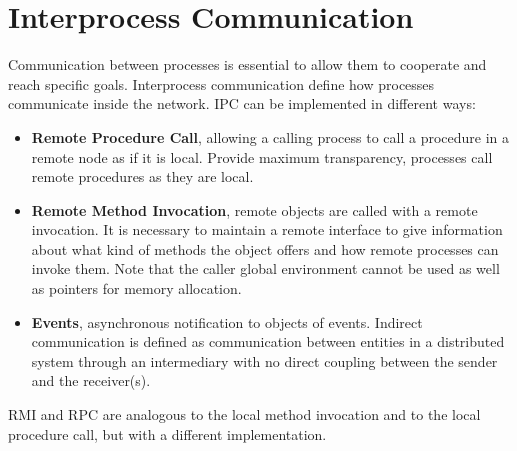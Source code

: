 \documentclass[11pt,a4paper]{article}
\begin{document}

\newcommand{\titolo}  {Afternotes}
\newcommand{\versione}{2.0}





\newpage



\newpage


\newpage




\section{Interprocess Communication}
Communication between processes is essential to allow them to cooperate and reach specific goals. Interprocess communication define how processes communicate inside the network. IPC can be implemented in different ways:
\begin{itemize}
	\item \textbf{Remote Procedure Call}, allowing a calling process to call a procedure in a remote node as if it is local. Provide maximum transparency, processes call remote procedures as they are local.
	\item \textbf{Remote Method Invocation}, remote objects are called with a remote invocation. It is necessary to maintain a remote interface to give information about what kind of methods the object offers and how remote processes can invoke them. Note that the caller global environment cannot be used as well as pointers for memory allocation.
	\item \textbf{Events}, asynchronous notification to objects of events. Indirect communication is defined as communication between entities in a distributed system through an intermediary with no direct coupling between the sender and the receiver(s).
\end{itemize}
RMI and RPC are analogous to the local method invocation and to the local procedure call, but with a different implementation.
\end{document}
